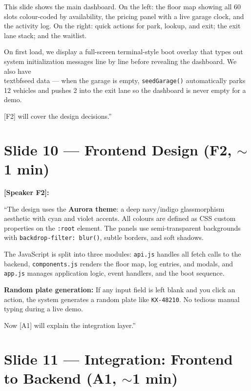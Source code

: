 \documentclass[12pt, a4paper]{article}
\begin{document}
This slide shows the main dashboard. On the left: the floor map showing all 60 slots colour-coded by availability, the pricing panel with a live garage clock, and the activity log. On the right: quick actions for park, lookup, and exit; the exit lane stack; and the waitlist.

On first load, we display a full-screen terminal-style boot overlay that types out system initialization messages line by line before revealing the dashboard. We also have \\textbf{seed data} --- when the garage is empty, \texttt{seedGarage()} automatically parks 12 vehicles and pushes 2 into the exit lane so the dashboard is never empty for a demo.

[F2] will cover the design decisions.''

\section{Slide 10 --- Frontend Design (F2, $\sim$1 min)}

\textbf{[Speaker F2]:}

``The design uses the \textbf{Aurora theme}: a deep navy/indigo glassmorphism aesthetic with cyan and violet accents. All colours are defined as CSS custom properties on the \texttt{:root} element. The panels use semi-transparent backgrounds with \texttt{backdrop-filter: blur()}, subtle borders, and soft shadows.

The JavaScript is split into three modules: \texttt{api.js} handles all fetch calls to the backend, \texttt{components.js} renders the floor map, log entries, and modals, and \texttt{app.js} manages application logic, event handlers, and the boot sequence.

\textbf{Random plate generation:} If any input field is left blank and you click an action, the system generates a random plate like \texttt{KX-48210}. No tedious manual typing during a live demo.

Now [A1] will explain the integration layer.''

\section{Slide 11 --- Integration: Frontend to Backend (A1, $\sim$1 min)}
\end{document}

